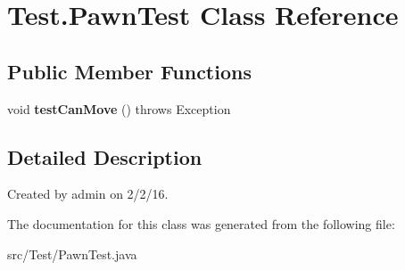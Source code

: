 \hypertarget{class_test_1_1_pawn_test}{}\section{Test.\+Pawn\+Test Class Reference}
\label{class_test_1_1_pawn_test}
\subsection*{Public Member Functions}
\begin{DoxyCompactItemize}
\item 
void {\bfseries test\+Can\+Move} ()  throws Exception \hypertarget{class_test_1_1_pawn_test_a0fe8fdca39f3e899cfb2c2db37d499f8}{}\label{class_test_1_1_pawn_test_a0fe8fdca39f3e899cfb2c2db37d499f8}

\end{DoxyCompactItemize}


\subsection{Detailed Description}
Created by admin on 2/2/16. 

The documentation for this class was generated from the following file\+:\begin{DoxyCompactItemize}
\item 
src/\+Test/Pawn\+Test.\+java\end{DoxyCompactItemize}
